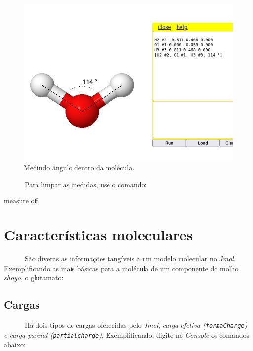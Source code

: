 \documentclass[
  letterpaper,
  DIV=11,
  numbers=noendperiod]{scrreprt}
\newenvironment{Shaded}{\begin{snugshade}}{\end{snugshade}}
\newcommand{\NormalTok}[1]{\textcolor[rgb]{0.00,0.23,0.31}{#1}}
\begin{document}
\begin{figure}[H]

{\centering \includegraphics{aguaAng.png}

}

\caption{Medindo ângulo dentro da molécula.}

\end{figure}%

~~~~~~Para limpar as medidas, use o comando:

\begin{Shaded}
\begin{Highlighting}[]
\NormalTok{measure off}
\end{Highlighting}
\end{Shaded}

\section{Características
moleculares}\label{caracteruxedsticas-moleculares}

~~~~~~São diveras as informações tangíveis a um modelo molecular no
\emph{Jmol}. Exemplificando as mais básicas para a molécula de um
componente do molho \emph{shoyo}, o glutamato:

\subsection{Cargas}\label{cargas}

~~~~~~Há dois tipos de cargas oferecidas pelo \emph{Jmol}, \emph{carga
efetiva (\texttt{formaCharge}) e carga parcial
(\texttt{partialcharge})}. Exemplificando, digite no \emph{Console} os
comandos abaixo:
\end{document}
